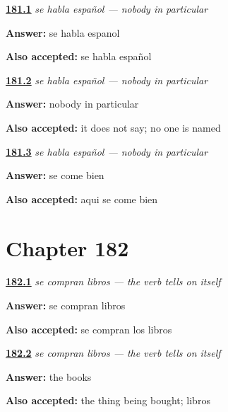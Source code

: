 \noindent\begin{minipage}[t]{\linewidth}
\raggedright
\hyperlink{review-ES-C52-se-habla-sign}{\textbf{181.1}} \emph{se habla español — nobody in particular}\par
\small \textbf{Answer:} se habla espanol\par
\footnotesize \textbf{Also accepted:} se habla español
\end{minipage}\par\medskip

\noindent\begin{minipage}[t]{\linewidth}
\raggedright
\hyperlink{review-ES-C52-se-habla-who}{\textbf{181.2}} \emph{se habla español — nobody in particular}\par
\small \textbf{Answer:} nobody in particular\par
\footnotesize \textbf{Also accepted:} it does not say; no one is named
\end{minipage}\par\medskip

\noindent\begin{minipage}[t]{\linewidth}
\raggedright
\hyperlink{review-ES-C52-se-habla-eat}{\textbf{181.3}} \emph{se habla español — nobody in particular}\par
\small \textbf{Answer:} se come bien\par
\footnotesize \textbf{Also accepted:} aqui se come bien
\end{minipage}\par\medskip

\section*{Chapter 182}

\noindent\begin{minipage}[t]{\linewidth}
\raggedright
\hyperlink{review-ES-C52-se-venden-plural}{\textbf{182.1}} \emph{se compran libros — the verb tells on itself}\par
\small \textbf{Answer:} se compran libros\par
\footnotesize \textbf{Also accepted:} se compran los libros
\end{minipage}\par\medskip

\noindent\begin{minipage}[t]{\linewidth}
\raggedright
\hyperlink{review-ES-C52-se-venden-agree}{\textbf{182.2}} \emph{se compran libros — the verb tells on itself}\par
\small \textbf{Answer:} the books\par
\footnotesize \textbf{Also accepted:} the thing being bought; libros
\end{minipage}\par\medskip

